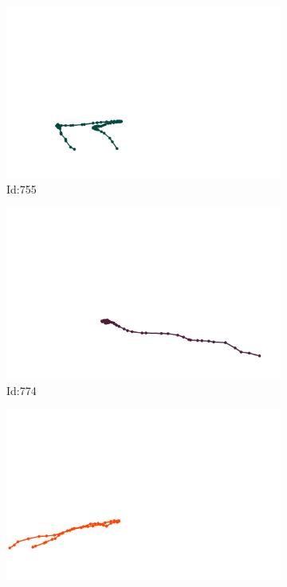 \documentclass[12pt,twoside]{report}
\begin{document}
\begin{figure}
\centering
\begin{subfigure}[b]{0.20\textwidth}
\centering
\includegraphics[width=\textwidth]{../../trajectories/755.png}
\caption{Id:755}
\end{subfigure}
\begin{subfigure}[b]{0.20\textwidth}
\centering
\includegraphics[width=\textwidth]{../../trajectories/774.png}
\caption{Id:774}
\end{subfigure}
\begin{subfigure}[b]{0.20\textwidth}
\centering
\includegraphics[width=\textwidth]{../../trajectories/961.png}

\end{subfigure}
\end{figure}
\end{document}
